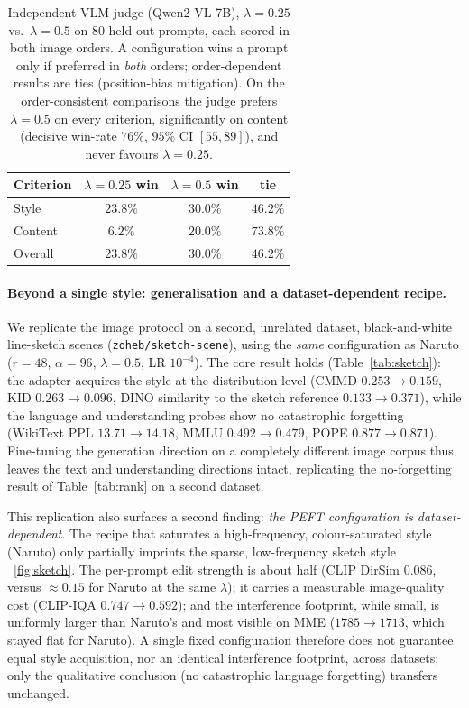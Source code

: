 \documentclass{article}
\begin{document}
\begin{table}[t]
\centering\small
\setlength{\tabcolsep}{8pt}
\begin{tabular}{lccc}
\toprule
Criterion & $\lambda{=}0.25$ win & $\lambda{=}0.5$ win & tie \\
\midrule
Style    & $23.8\%$ & $\mathbf{30.0\%}$ & $46.2\%$ \\
Content  & $6.2\%$  & $\mathbf{20.0\%}$ & $73.8\%$ \\
Overall  & $23.8\%$ & $\mathbf{30.0\%}$ & $46.2\%$ \\
\bottomrule
\end{tabular}
\caption{Independent VLM judge (Qwen2-VL-7B), $\lambda{=}0.25$ vs.\ $\lambda{=}0.5$
on $80$ held-out prompts, each scored in both image orders. A configuration wins a
prompt only if preferred in \emph{both} orders; order-dependent results are ties
(position-bias mitigation). On the order-consistent comparisons the judge prefers
$\lambda{=}0.5$ on every criterion, significantly on content (decisive win-rate
$76\%$, $95\%$ CI $[55,89]$), and never favours $\lambda{=}0.25$.}
\label{tab:judge}
\end{table}

\paragraph{Beyond a single style: generalisation and a dataset-dependent recipe.}
We replicate the image protocol on a second, unrelated dataset, black-and-white
line-sketch scenes (\texttt{zoheb/sketch-scene}), using the \emph{same}
configuration as Naruto ($r{=}48$, $\alpha{=}96$, $\lambda{=}0.5$, LR $10^{-4}$).
The core result holds (Table~\ref{tab:sketch}): the adapter acquires the style at
the distribution level (CMMD $0.253\!\to\!0.159$, KID $0.263\!\to\!0.096$, DINO
similarity to the sketch reference $0.133\!\to\!0.371$), while the language and
understanding probes show no catastrophic forgetting (WikiText PPL
$13.71\!\to\!14.18$, MMLU $0.492\!\to\!0.479$, POPE $0.877\!\to\!0.871$).
Fine-tuning the generation direction on a completely different image corpus thus
leaves the text and understanding directions intact, replicating the
no-forgetting result of Table~\ref{tab:rank} on a second dataset.

This replication also surfaces a second finding: \emph{the PEFT configuration is
dataset-dependent}. The recipe that saturates a high-frequency, colour-saturated
style (Naruto) only partially imprints the sparse, low-frequency sketch style ~\ref{fig:sketch}.
The per-prompt edit strength is about half (CLIP DirSim $0.086$, versus
$\approx0.15$ for Naruto at the same $\lambda$); it carries a measurable
image-quality cost (CLIP-IQA $0.747\!\to\!0.592$); and the interference
footprint, while small, is uniformly larger than Naruto's and most visible on MME
($1785\!\to\!1713$, which stayed flat for Naruto). A single fixed configuration
therefore does not guarantee equal style acquisition, nor an identical
interference footprint, across datasets; only the qualitative conclusion (no
catastrophic language forgetting) transfers unchanged.
\end{document}
